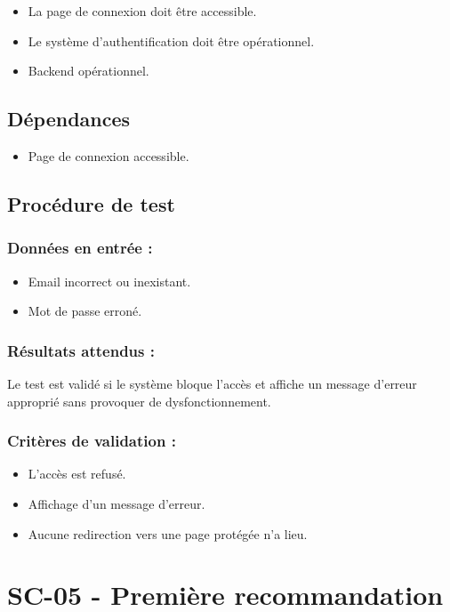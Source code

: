 \documentclass[a4paper,12pt]{report}
\begin{document}
\begin{itemize}
    \item La page de connexion doit être accessible.
    \item Le système d’authentification doit être opérationnel.
    \item Backend opérationnel.
\end{itemize}

\subsection*{Dépendances}
\begin{itemize}
    \item Page de connexion accessible. 
\end{itemize}
\subsection*{Procédure de test}
\subsubsection{Données en entrée :}
\begin{itemize}
    \item Email incorrect ou inexistant.
    \item Mot de passe erroné.
\end{itemize}

\subsubsection{Résultats attendus :}
Le test est validé si le système bloque l’accès et affiche un message d’erreur approprié sans provoquer de dysfonctionnement.


\subsubsection{Critères de validation :}
\begin{itemize}
    \item L’accès est refusé.
    \item Affichage d'un message d'erreur.
    \item Aucune redirection vers une page protégée n’a lieu.
\end{itemize}

\newpage
 
\section{SC-05 - Première recommandation}
\label{Rec1}
\end{document}
